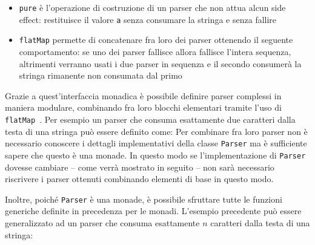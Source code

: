 \begin{itemize}
  \item \lstinline{pure} è l'operazione di costruzione di un parser che non attua alcun side effect: restituisce il valore \lstinline{a} senza consumare la stringa e senza fallire
  \item \lstinline{flatMap} permette di concatenare fra loro dei parser ottenendo il seguente comportamento: se uno dei parser fallisce allora fallisce l'intera sequenza, altrimenti verranno usati i due parser in sequenza e il secondo consumerà la stringa rimanente non consumata dal primo
\end{itemize}

Grazie a quest'interfaccia monadica è possibile definire parser complessi in maniera modulare, combinando fra loro blocchi elementari tramite l'uso di \lstinline{flatMap}~\cite{cit:monadic-parsing-in-haskell}. Per esempio un parser che consuma esattamente due caratteri dalla testa di una stringa può essere definito come:
Per combinare fra loro parser non è necessario conoscere i dettagli implementativi della classe \lstinline{Parser} ma è sufficiente sapere che questo è una monade. In questo modo se l'implementazione di \lstinline{Parser} dovesse cambiare -- come verrà mostrato in seguito -- non sarà necessario riscrivere i parser ottenuti combinando elementi di base in questo modo.

Inoltre, poiché \lstinline{Parser} è una monade, è possibile sfruttare tutte le funzioni generiche definite in precedenza per le monadi. L'esempio precedente può essere generalizzato ad un parser che consuma esattamente $n$ caratteri dalla testa di una stringa:

